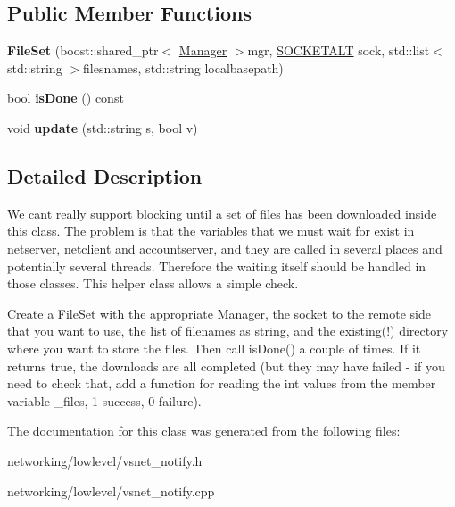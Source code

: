 \subsection*{Public Member Functions}
\begin{DoxyCompactItemize}
\item 
{\bfseries File\+Set} (boost\+::shared\+\_\+ptr$<$ \hyperlink{classVsnetDownload_1_1Client_1_1Manager}{Manager} $>$mgr, \hyperlink{classSOCKETALT}{S\+O\+C\+K\+E\+T\+A\+LT} sock, std\+::list$<$ std\+::string $>$filesnames, std\+::string localbasepath)\hypertarget{classVsnetDownload_1_1Client_1_1FileSet_a0686d2715e5e2878266a4f37c7868bbc}{}\label{classVsnetDownload_1_1Client_1_1FileSet_a0686d2715e5e2878266a4f37c7868bbc}

\item 
bool {\bfseries is\+Done} () const \hypertarget{classVsnetDownload_1_1Client_1_1FileSet_a88a941eccb688b88ce8b1b21969bb400}{}\label{classVsnetDownload_1_1Client_1_1FileSet_a88a941eccb688b88ce8b1b21969bb400}

\item 
void {\bfseries update} (std\+::string s, bool v)\hypertarget{classVsnetDownload_1_1Client_1_1FileSet_af6a456de28ce47893babba9c13b12686}{}\label{classVsnetDownload_1_1Client_1_1FileSet_af6a456de28ce47893babba9c13b12686}

\end{DoxyCompactItemize}


\subsection{Detailed Description}
We can\textquotesingle{}t really support blocking until a set of files has been downloaded inside this class. The problem is that the variables that we must wait for exist in netserver, netclient and accountserver, and they are called in several places and potentially several threads. Therefore the waiting itself should be handled in those classes. This helper class allows a simple check.

Create a \hyperlink{classVsnetDownload_1_1Client_1_1FileSet}{File\+Set} with the appropriate \hyperlink{classVsnetDownload_1_1Client_1_1Manager}{Manager}, the socket to the remote side that you want to use, the list of filenames as string, and the existing(!) directory where you want to store the files. Then call is\+Done() a couple of times. If it returns true, the downloads are all completed (but they may have failed -\/ if you need to check that, add a function for reading the int values from the member variable \+\_\+files, 1 success, 0 failure). 

The documentation for this class was generated from the following files\+:\begin{DoxyCompactItemize}
\item 
networking/lowlevel/vsnet\+\_\+notify.\+h\item 
networking/lowlevel/vsnet\+\_\+notify.\+cpp\end{DoxyCompactItemize}
